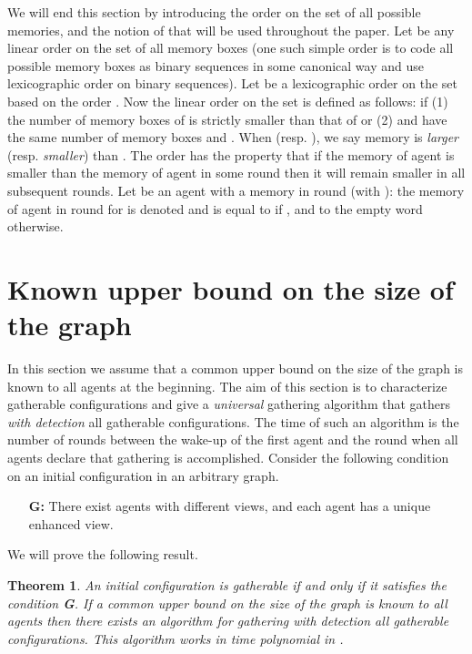 \documentclass[11pt]{article}
\newtheorem{theorem}{Theorem}[section]
\begin{document}
 {We will end this section by introducing the order  on the set  of all possible memories, and the notion of  that will be used throughout the paper. Let  be any linear order on the set of all memory boxes (one such simple order is to code all possible memory boxes as binary sequences in some canonical way and use lexicographic order on binary sequences). Let  be a lexicographic order on the set  based on the order . Now the linear order  on the set  is defined as follows:  if (1) the number of memory boxes of  is strictly smaller than that of  or (2)  and  have the same number of memory boxes and . When  (resp. ), we say memory  is {\em larger} (resp. {\em smaller}) than . The order  has the property that if the memory of agent  is smaller than the memory of agent  in some round then it will remain smaller in all subsequent rounds. Let  be an agent with a memory  in round  (with ): the memory of agent  in round  for  is denoted  and is equal to  if , and to the empty word otherwise.}




\section{Known upper bound on the size of the graph}

In this section we assume that a common upper bound  on the size of the graph is known to all agents at the beginning.
The aim of this section is to characterize gatherable configurations and give a {\em universal} gathering algorithm that gathers {\em with detection} all gatherable configurations. The time of such an algorithm is the number of rounds between the wake-up of the first agent and the round when
all agents declare that gathering is accomplished.
Consider the following condition on an initial configuration in an arbitrary graph.
\begin{itemize}
\item
[{\bf G:}] There exist agents with different views, and each agent has a unique enhanced view.
\end{itemize}

We will prove the following result.

\begin{theorem}\label{eq}
An initial configuration is gatherable if and only if it satisfies the condition {\bf G}. If a common upper bound  on the size of the graph is known to all agents then
there exists an algorithm for gathering with detection all gatherable configurations. This algorithm works in time polynomial in .
\end{theorem}
\end{document}
